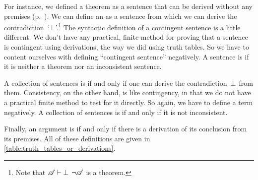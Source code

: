 For instance, we defined a theorem as a sentence that can be derived
without any premises (p.~\pageref{def:syntactic_tautology_in_sl}).
We can define an %
\label{def:syntactic_contradiction_in_sl} as a sentence from which we
can derive the contradiction~`$\bot$'.\footnote{Note that $\mathscr{A}
\vdash \bot$ \ifeff{} $\lnot \mathscr{A}$ is a theorem.} The syntactic
definition of a contingent sentence is a little different. We don't
have any practical, finite method for proving that a sentence is
contingent using derivations, the way we did using truth tables. So we
have to content ourselves with defining ``contingent sentence''
negatively. A sentence is  \label{def:syntactically_contingent_in_sl} if it is neither a
theorem nor an inconsistent sentence.

A collection of sentences is 
\label{def:syntactically_inconsistent_ in_sl} if and only if one can
derive the contradiction~$\bot$ from them. Consistency, on the other
hand, is like contingency, in that we do not have a practical finite
method to test for it directly. So again, we have to define a term
negatively. A collection of sentences is 
\label{def:syntactically consistent in SL} if and only if it is not
inconsistent.

Finally, an argument is  \label{def:syntactically_valid_in_SL} if and only if there is a derivation of its conclusion from its premises. All of these definitions are given in \cref{table:truth_tables_or_derivations}.

